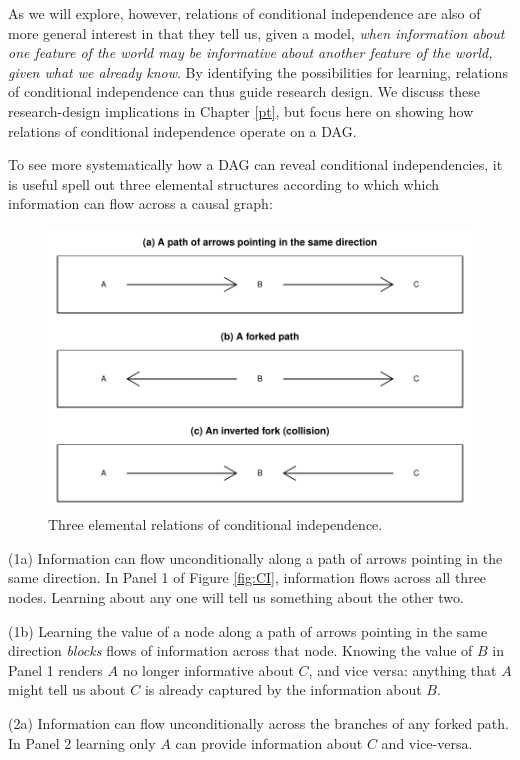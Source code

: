 \documentclass[
  12pt,
]{book}
\begin{document}
As we will explore, however, relations of conditional independence are also of more general interest in that they tell us, given a model, \emph{when information about one feature of the world may be informative about another feature of the world, given what we already know}. By identifying the possibilities for learning, relations of conditional independence can thus guide research design. We discuss these research-design implications in Chapter \ref{pt}, but focus here on showing how relations of conditional independence operate on a DAG.

To see more systematically how a DAG can reveal conditional independencies, it is useful spell out three elemental structures according to which which information can flow across a causal graph:

\begin{figure}

{\centering \includegraphics[width=0.7\linewidth]{ii_files/figure-latex/pathsexp-1} 

}

\caption{\label{fig:CI} Three elemental relations of conditional independence.}\label{fig:pathsexp}
\end{figure}

(1a) Information can flow unconditionally along a path of arrows pointing in the same direction. In Panel 1 of Figure \ref{fig:CI}, information flows across all three nodes. Learning about any one will tell us something about the other two.

(1b) Learning the value of a node along a path of arrows pointing in the same direction \emph{blocks} flows of information across that node. Knowing the value of \(B\) in Panel 1 renders \(A\) no longer informative about \(C\), and vice versa: anything that \(A\) might tell us about \(C\) is already captured by the information about \(B\).

(2a) Information can flow unconditionally across the branches of any forked path. In Panel 2 learning only \(A\) can provide information about \(C\) and vice-versa.
\end{document}
